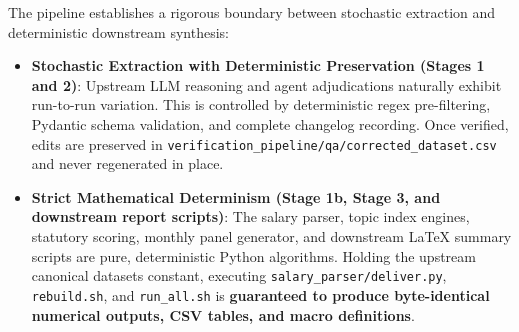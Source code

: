 The pipeline establishes a rigorous boundary between stochastic extraction and deterministic downstream synthesis:
\begin{itemize}[leftmargin=1.5em]
  \item \textbf{Stochastic Extraction with Deterministic Preservation (Stages 1 and 2)}: Upstream LLM reasoning and agent adjudications naturally exhibit run-to-run variation. This is controlled by deterministic regex pre-filtering, Pydantic schema validation, and complete changelog recording. Once verified, edits are preserved in \nolinkurl{verification_pipeline/qa/corrected_dataset.csv} and never regenerated in place.
  \item \textbf{Strict Mathematical Determinism (Stage 1b, Stage 3, and downstream report scripts)}: The salary parser, topic index engines, statutory scoring, monthly panel generator, and downstream LaTeX summary scripts are pure, deterministic Python algorithms. Holding the upstream canonical datasets constant, executing \nolinkurl{salary_parser/deliver.py}, \nolinkurl{rebuild.sh}, and \nolinkurl{run_all.sh} is \textbf{guaranteed to produce byte-identical numerical outputs, CSV tables, and macro definitions}.
\end{itemize}
